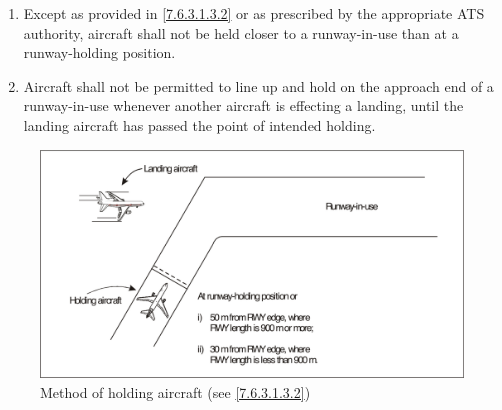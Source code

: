 \begin{enumeratesc}
\begin{enumerate}[labelindent=0pt,itemsep=0.2cm]
        \begin{enumerate}
            \item Except as provided in \ref{7.6.3.1.3.2} or as prescribed by the appropriate ATS authority, aircraft shall not be held closer to a runway-in-use than at a runway-holding position.
            \item \label{7.6.3.1.3.2} Aircraft shall not be permitted to line up and hold on the approach end of a runway-in-use whenever another aircraft is effecting a landing, until the landing aircraft has passed the point of intended holding.
        \end{enumerate}

        \vspace{0.5cm}
        \begin{figure}[!ht]
            \centering
            \includegraphics[width=14cm]{Images/Fig 7-2.png}
            \caption[Method of holding aircraft]{Method of holding aircraft (see \ref{7.6.3.1.3.2})}
            \label{fig:7-2}
        \end{figure}


\end{enumerate}
\end{enumeratesc}

